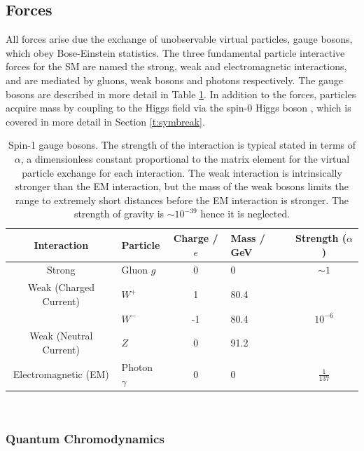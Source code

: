 	\subsection{Forces}
		
		All forces arise due the exchange of unobservable virtual particles, gauge bosons, which obey Bose-Einstein statistics. The three fundamental particle interactive forces for the SM are named the strong, weak and electromagnetic interactions, and are mediated by gluons, weak bosons and photons respectively. The gauge bosons are described in more detail in Table \ref{t:tab:boson}. In addition to the forces, particles acquire mass by coupling to the Higgs field via the spin-0 Higgs boson \cite{gauge-boson-mass, higgs-1, higgs-2}, which is covered in more detail in Section \ref{t:symbreak}. 
		
		\begin{table}[ht]
			\caption{Spin-1 gauge bosons. The strength of the interaction is typical stated in terms of $\alpha$, a dimensionless constant proportional to the matrix element for the virtual particle exchange for each interaction. The weak interaction is intrinsically stronger than the EM interaction, but the mass of the weak bosons limits the range to extremely short distances before the EM interaction is stronger.  The strength of gravity is $\sim 10^{-39}$ hence it is neglected. \cite{pdg}}
			\label{t:tab:boson}
			\medskip
			\centering
			\begin{tabular}{clclc}\toprule
				Interaction & Particle & Charge / $e$ & Mass / GeV & Strength ($\alpha$) \\\midrule
				Strong    &     Gluon $g$      &    0   & 0& $\sim1$\\
				Weak (Charged Current)&     $W^+$    &    1   & 80.4 & \\
				&     $W^-$    &    -1   & 80.4 & $10^{-6}$ \\
				Weak (Neutral Current)&     $Z$   &    0   & 91.2 & \\
				Electromagnetic (EM)   &     Photon $\gamma$  &   0   & 0 & $\frac{1}{137}$\\\bottomrule
			\end{tabular}\\[5pt]
		\end{table}
		
		\subsubsection{Quantum Chromodynamics}
		

